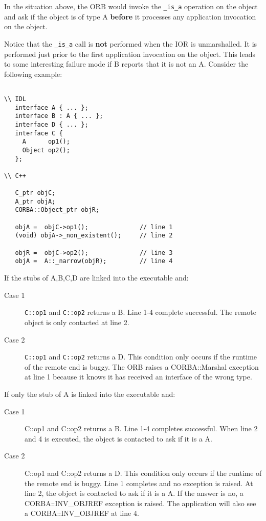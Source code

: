 \documentclass[11pt,twoside,onecolumn]{book}
\begin{document}
In the situation above, the ORB would invoke the {\tt \_is\_a}
operation on the object and ask if the object is of type A {\bf before}
it processes any application invocation on the object.

Notice that the {\tt \_is\_a} call is {\bf not} performed when the IOR is
unmarshalled. It is performed just prior to the first application
invocation on the object. This leads to some interesting failure mode if
B reports that it is not an A. Consider the following example:

{\small
\begin{verbatim}

\\ IDL
   interface A { ... };
   interface B : A { ... };
   interface D { ... };
   interface C {
     A      op1();
     Object op2();
   };

\\ C++

   C_ptr objC;
   A_ptr objA;
   CORBA::Object_ptr objR;

   objA =  objC->op1();              // line 1
   (void) objA->_non_existent();     // line 2

   objR =  objC->op2();              // line 3
   objA =  A::_narrow(objR);         // line 4

\end{verbatim}
}

\noindent If the stubs of A,B,C,D are linked into the executable and:

\begin{description}
\item[Case 1] {\tt C::op1} and {\tt C::op2} returns a B. Line 1-4 complete successful. The
remote object is only contacted at line 2.
\item[Case 2] {\tt C::op1} and {\tt C::op2} returns a D. This condition only occurs if the
runtime of the remote end is buggy. The ORB raises a CORBA::Marshal
exception at line 1 because it knows it has received an interface of the
wrong type.
\end{description}

\noindent If only the stub of A is linked into the executable and:

\begin{description}
\item[Case 1] C::op1 and C::op2 returns a B. Line 1-4 completes successful. When
line 2 and 4 is executed, the object is contacted to ask if it is a A.
\item[Case 2] C::op1 and C::op2 returns a D. This condition only occurs if the
runtime of the remote end is buggy. Line 1 completes and no exception is
raised. At line 2, the object is contacted to ask if it is a A. If the
answer is no, a CORBA::INV\_OBJREF exception is raised. The application will
also see a CORBA::INV\_OBJREF at line 4.
\end{description}
\end{document}
